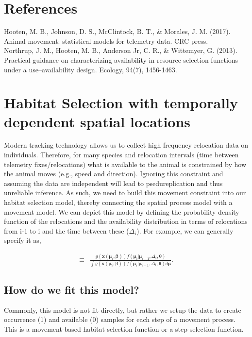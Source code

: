 \documentclass[12pt]{article}
\begin{document}
\section{References}

\indent\indent  Hooten, M. B., Johnson, D. S., McClintock, B. T., \& Morales, J. M. (2017). Animal movement: statistical models for telemetry data. CRC press.\\

Northrup, J. M., Hooten, M. B., Anderson Jr, C. R., \& Wittemyer, G. (2013). Practical guidance on characterizing availability in resource selection functions under a use–availability design. Ecology, 94(7), 1456-1463.



\section{Habitat Selection with temporally dependent spatial locations}

Modern tracking technology allows us to collect high frequency relocation data on individuals. Therefore, for many species and relocation intervals (time between telemetry fixes/relocations) what is available to the animal is constrained by how the animal moves (e.g., speed and direction). Ignoring this constraint and assuming the data are independent will lead to psedureplication and thus unreliable inference. As such, we need to build this movement constraint into our habitat selection model, thereby connecting the spatial process model with a movement model. We can depict this model by defining the probability density function of the relocations and the availability distribution in terms of relocations from i-1 to i and the time between these ($\Delta_{i}$). For example, we can generally specify it as,

\begin{align*}
[\boldsymbol{\mu}_{i}|\boldsymbol{\mu}_{i-1} \boldsymbol{\beta}, \boldsymbol{\theta}] \equiv &  \frac{g(\textbf{x}(\boldsymbol{\mu}_{i}, \boldsymbol{\beta}))f(\boldsymbol{\mu}_{i}|\boldsymbol{\mu}_{i-1},\Delta_{i},\boldsymbol{\theta})}{\int g(\textbf{x}(\boldsymbol{\mu}_{i}, \boldsymbol{\beta}))f(\boldsymbol{\mu}_{i}|\boldsymbol{\mu}_{i-1},\Delta_{i},\boldsymbol{\theta})d\boldsymbol{\mu}}.
\end{align*}

\subsection{How do we fit this model?}

Commonly, this model is not fit directly, but rather we setup the data to create occurrence (1) and available (0) samples for each step of a movement process. This is a movement-based habitat selection function or a step-selection function. 
\end{document}
